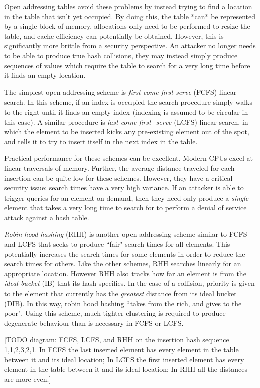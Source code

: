 \documentclass{cccg13}
\begin{document}
Open addressing tables avoid these problems by instead trying to find a
location in the table that isn't yet occupied. By doing this, the table *can*
be represented by a single block of memory, allocations only need to be
performed to resize the table, and cache efficiency can potentially be
obtained. However, this is significantly more brittle from a security
perspective. An attacker no longer needs to be able to produce true hash
collisions, they may instead simply produce sequences of values which require
the table to search for a very long time before it finds an empty location.

The simplest open addressing scheme is \emph{first-come-first-serve} (FCFS)
linear search. In this scheme, if an index is occupied the search procedure
simply walks to the right until it finds an empty index (indexing is assumed
to be circular in this case). A similar procedure is \emph{last-come-first-
serve} (LCFS) linear search, in which the element to be inserted kicks any
pre-existing element out of the spot, and tells it to try to insert itself in
the next index in the table.

Practical performance for these schemes can be excellent. Modern CPUs excel at
linear traversals of memory. Further, the average distance traveled for each
insertion can be quite low for these schemes. However, they have a critical
security issue: search times have a very high variance. If an attacker is able
to trigger queries for an element on-demand, then they need only produce a
\emph{single} element that takes a very long time to search for to perform a
denial of service attack against a hash table.

\emph{Robin hood hashing} (RHH) is another open addressing scheme similar to
FCFS and LCFS that seeks to produce ``fair" search times for all elements.
This potentially increases the search times for some elements in order to
reduce the search times for others. Like the other schemes, RHH searches
linearly for an appropriate location. However RHH also tracks how far an
element is from the \emph{ideal bucket} (IB) that its hash specifies. In the
case of a collision, priority is given to the element that currently has the
\emph{greatest} distance from its ideal bucket (DIB). In this way, robin hood
hashing ``takes from the rich, and gives to the poor". Using this scheme, much
tighter clustering is required to produce degenerate behaviour than is
necessary in FCFS or LCFS.

[TODO diagram: FCFS, LCFS, and RHH on the insertion hash sequence 1,1,2,3,2,1.
In FCFS the last inserted element has every element in the table between it
and its ideal location; In LCFS the first inserted element has every element
in the table between it and its ideal location; In RHH all the distances are
more even.]
\end{document}
